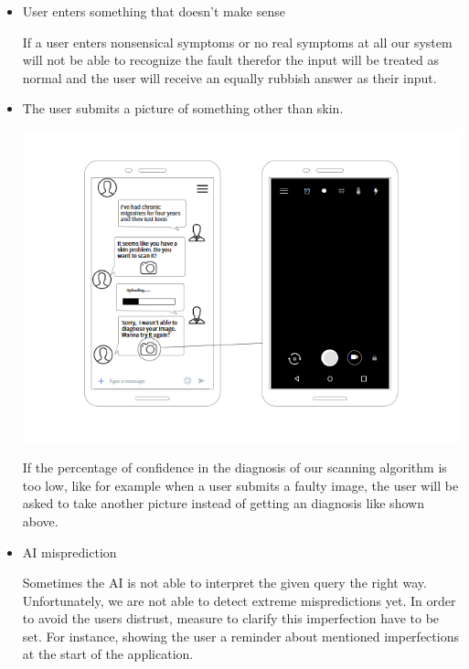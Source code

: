 \begin{itemize}
    \item User enters something that doesn't make sense
    
    If a user enters nonsensical symptoms or no real  symptoms at all our system will not be able to recognize the fault therefor the input will be treated as normal and the user will receive an equally rubbish answer as their input. 
    
    \item \hypertarget{ScanSkinNonStandard}{The user submits a picture of something other than skin.}
        
        \begin{center}
            \includegraphics[scale=.7]{SystemSpec/Usecases/Mocks/getdiagnosis02.png}\\
        \end{center}{}
    
        If the percentage of confidence in the diagnosis of our scanning algorithm is too low, like for example when a user submits a faulty image, the user will be asked to take another picture instead of getting an diagnosis like shown above.
    
    \item AI misprediction

    Sometimes the AI is not able to interpret the given query the right way. Unfortunately, we are not able to detect extreme mispredictions yet. In order to avoid the users distrust, measure to clarify this imperfection have to be set. For instance, showing the user a reminder about mentioned imperfections at the start of the application. 

\end{itemize}

\pagebreak
